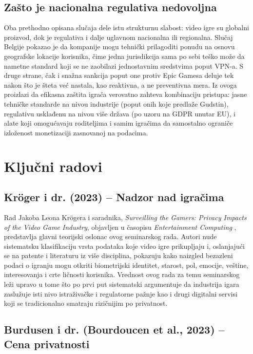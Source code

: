 \documentclass[12pt]{article}
\begin{document}
\subsection{Zašto je nacionalna regulativa nedovoljna}

Oba prethodno opisana slučaja dele istu strukturnu slabost: video igre su globalni proizvod, dok je regulativa i dalje uglavnom nacionalna ili regionalna. Slučaj Belgije pokazao je da kompanije mogu tehnički prilagoditi ponudu na osnovu geografske lokacije korisnika, čime jedna jurisdikcija sama po sebi teško može da nametne standard koji se ne zaobilazi jednostavnim sredstvima poput VPN-a. S druge strane, čak i snažna sankcija poput one protiv Epic Gamesa deluje tek nakon što je šteta već nastala, kao reaktivna, a ne preventivna mera. Iz ovoga proizlazi da efikasna zaštita igrača verovatno zahteva kombinaciju pristupa: jasne tehničke standarde na nivou industrije (poput onih koje predlaže Gudstin), regulativu usklađenu na nivou više država (po uzoru na GDPR unutar EU), i alate koji omogućavaju roditeljima i samim igračima da samostalno ograniče izloženost monetizaciji zasnovanoj na podacima.

\section{Ključni radovi}
\subsection{Kröger i dr. (2023) -- Nadzor nad igračima}

Rad Jakoba Leona Krögera i saradnika, \textit{Surveilling the Gamers: Privacy Impacts of the Video Game Industry}, objavljen u časopisu \textit{Entertainment Computing} \cite{kroger2023}, predstavlja glavni teorijski oslonac ovog seminarskog rada. Autori nude sistematsku klasifikaciju vrsta podataka koje video igre prikupljaju i, oslanjajući se na patente i literaturu iz više disciplina, pokazuju kako naizgled bezazleni podaci o igranju mogu otkriti biometrijski identitet, starost, pol, emocije, veštine, interesovanja i crte ličnosti korisnika. Vrednost ovog rada za temu seminarskog leži upravo u tome što po prvi put sistematski argumentuje da industrija igara zaslužuje isti nivo istraživačke i regulatorne pažnje kao i drugi digitalni servisi koji se tradicionalno smatraju rizičnijim po privatnost.
\subsection{Burdusen i dr. (Bourdoucen et al., 2023) -- Cena privatnosti}
\end{document}
